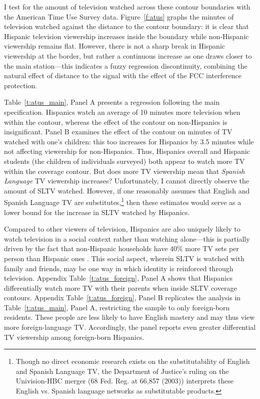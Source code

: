 \documentclass[11pt]{article}
\begin{document}
I test for the amount of television watched across these contour boundaries with the American Time Use Survey data. Figure~\ref{f:atus} graphs the minutes of television watched against the distance to the contour boundary: it is clear that Hispanic television viewership increases inside the boundary while non-Hispanic viewership remains flat. However, there is not a sharp break in Hispanic viewership at the border, but rather a continuous increase as one draws closer to the main station---this indicates a fuzzy regression discontinuity, combining the natural effect of distance to the signal with the effect of the FCC interference protection. 

Table~\ref{t:atus_main}, Panel A presents a regression following the main specification. Hispanics watch an average of 10 minutes more television when within the contour, whereas the effect of the contour on non-Hispanics is insignificant. Panel B examines the effect of the contour on minutes of TV watched with one's children: this too increases for Hispanics by 3.5 minutes while not affecting viewership for non-Hispanics. Thus, Hispanics overall and Hispanic students (the children of individuals surveyed) both appear to watch more TV within the coverage contour. But does more TV viewership mean that \textit{Spanish Language} TV viewership increases? Unfortunately, I cannot directly observe the amount of SLTV watched. However, if one reasonably assumes that English and Spanish Language TV are substitutes,\footnote{ Though no direct economic research exists on the substitutability of English and Spanish Language TV, the Department of Justice's ruling on the Univision-HBC merger (68 Fed. Reg. at 66,857 (2003)) interprets these English vs. Spanish language networks as substitutable products.} then these estimates would serve as a lower bound for the increase in SLTV watched by Hispanics. 


Compared to other viewers of television, Hispanics are also uniquely likely to watch television in a social context rather than watching alone---this is partially driven by the fact that non-Hispanic households have 40\% more TV sets per person than Hispanic ones \citep{coghill_tuning_2018}. This social aspect, wherein SLTV is watched with family and friends, may be one way in which identity is reinforced through television. Appendix Table~\ref{t:atus_foreign}, Panel A shows that Hispanics differentially watch more TV with their parents when inside SLTV coverage contours. Appendix Table~\ref{t:atus_foreign}, Panel B replicates the analysis in Table~\ref{t:atus_main}, Panel A, restricting the sample to only foreign-born residents. These people are less likely to have English mastery and may thus view more foreign-language TV. Accordingly, the panel reports even greater differential TV viewership among foreign-born Hispanics.
\end{document}
